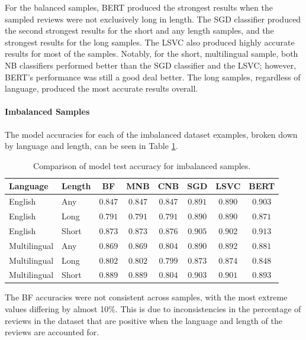 For the balanced samples, BERT produced the strongest results when the sampled reviews were not exclusively long in length. The SGD classifier produced the second strongest results for the short and any length samples, and the strongest results for the long samples. The LSVC also produced highly accurate results for most of the samples. Notably, for the short, multilingual sample, both NB classifiers performed better than the SGD classifier and the LSVC; however, BERT's performance was still a good deal better. The long samples, regardless of language, produced the most accurate results overall.

\paragraph{Imbalanced Samples}

The model accuracies for each of the imbalanced dataset examples, broken down by language and length, can be seen in Table \ref{tab:Res_RF_Pol_CompImb}.

\begin{table}[ht]
    \centering
    \begin{tabular}{l l | c c c c c c}
        \toprule
        \textbf{Language} & \textbf{Length} & \textbf{BF} & \textbf{MNB} & \textbf{CNB} & \textbf{SGD} & \textbf{LSVC} & \textbf{BERT}\\\midrule
        English & Any &$0.847$&$0.847$&$0.847$&$0.891$&$0.890$&$\mathbf{0.903}$\\
        English & Long & $0.791$&$0.791$&$0.791$&$0.890$&$\mathbf{0.890}$&$0.871$\\
        English & Short & $0.873$&$0.873$&$0.876$&$0.905$&$0.902$&$\mathbf{0.913}$\\\midrule
        Multilingual & Any &$0.869$&$0.869$&$0.804$&$0.890$&$\mathbf{0.892}$&$0.881$\\
        Multilingual & Long & $0.802$&$0.802$&$0.799$&$0.873$&$\mathbf{0.874}$&$0.848$\\
        Multilingual & Short & $0.889$&$0.889$&$0.804$&$\mathbf{0.903}$&$0.901$&$0.893$\\
        \bottomrule
    \end{tabular}
    \caption{Comparison of model test accuracy for imbalanced samples.}
    \label{tab:Res_RF_Pol_CompImb}
\end{table}

The BF accuracies were not consistent across samples, with the most extreme values differing by almost 10\%. This is due to inconsistencies in the percentage of reviews in the dataset that are positive when the language and length of the reviews are accounted for.

